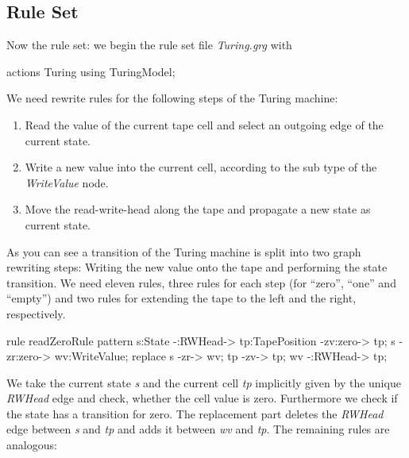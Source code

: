 \subsection{Rule Set}
Now the rule set: we begin the rule set file \emph{Turing.grg} with
\begin{grgen}[firstnumber=1] 
actions Turing using TuringModel;

\end{grgen}
We need rewrite rules for the following steps of the Turing machine:
\begin{enumerate}
  \item Read the value of the current tape cell and select an outgoing edge of the current state.
  \item Write a new value into the current cell, according to the sub type of the \emph{WriteValue} node.
  \item Move the read-write-head along the tape and propagate a new state as current state. 
\end{enumerate}
As you can see a transition of the Turing machine is split into two graph rewriting steps: Writing the new value onto the tape and performing the state transition. We need eleven rules, three rules for each step (for ``zero'', ``one'' and ``empty'') and two rules for extending the tape to the left and the right, respectively.
\begin{grgen}[firstnumber=last] 
rule readZeroRule {
	pattern {
		s:State -:RWHead-> tp:TapePosition -zv:zero-> tp;
		s -zr:zero-> wv:WriteValue;
	}
	replace {
		s -zr-> wv;
		tp -zv-> tp;
		wv -:RWHead-> tp;
	}
}      

\end{grgen}
We take the current state \emph{s} and the current cell \emph{tp} implicitly given by the unique \emph{RWHead} edge and check, whether the cell value is zero. Furthermore we check if the state has a transition for zero. The replacement part deletes the \emph{RWHead} edge between \emph{s} and \emph{tp} and adds it between \emph{wv} and \emph{tp}. The remaining rules are analogous:
